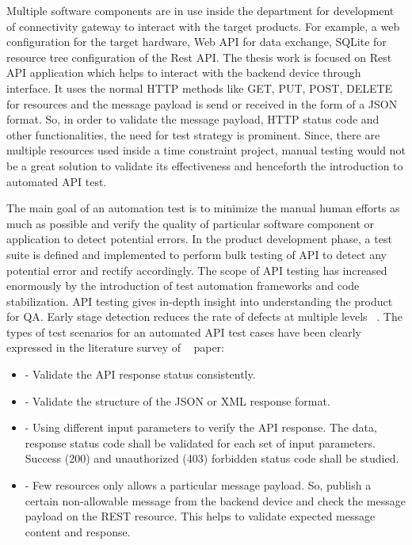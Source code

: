 Multiple software components are in use inside the department for development of connectivity gateway to interact with the target products. For example, a web configuration for the target hardware, Web \ac{API} for data exchange, SQLite for resource tree configuration of the Rest \ac{API}. The thesis work is focused on Rest API application which helps to interact with the backend device through interface. It uses the normal HTTP methods like GET, PUT, POST, DELETE for resources and the message payload is send or received in the form of a \ac{JSON} format. So, in order to validate the message payload, HTTP status code and other functionalities, the need for test strategy is prominent. Since, there are multiple resources used inside a time constraint project, manual testing would not be a great solution to validate its effectiveness and henceforth the introduction to automated API test.

The main goal of an automation test is to minimize the manual human efforts as much as possible and verify the quality of particular software component or application to detect potential errors. In the product development phase, a test suite is defined and implemented to perform bulk testing of API to detect any potential error and rectify accordingly. The scope of API testing has increased enormously by the introduction of test automation frameworks and code stabilization. API testing gives in-depth insight into understanding the product for \ac{QA}. Early stage detection reduces the rate of defects at multiple levels ~\parencite{asha2015api}. The types of test scenarios for an automated API test cases have been clearly expressed in the literature survey of ~\parencite{sharma2018automated} paper:
\begin{itemize}
\item {} - Validate the API response status consistently.
\item {} - Validate the structure of the JSON or XML response format.
\item {} - Using different input parameters to verify the API response. The data, response status code shall be validated for each set of input parameters. Success (200) and unauthorized (403) forbidden status code shall be studied.
\item {} - Few resources only allows a particular message payload. So, publish a certain non-allowable message from the backend device and check the message payload on the REST resource. This helps to validate expected message content and response.
\end{itemize}
